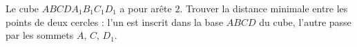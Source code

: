 Le cube $ABCDA_1B_1C_1D_1$ a pour arête $2$. Trouver la distance minimale entre les points de deux cercles : l'un est inscrit dans la base $ABCD$ du cube, l'autre passe par les sommets $A$, $C$, $D_1$.
